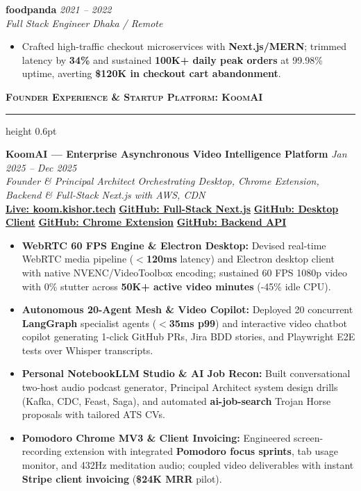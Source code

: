 \documentclass[9.5pt,a4paper]{article}
\newcommand{\resumesection}[1]{%
    \vspace{4.0pt}%
    {\color{burgundy}\scshape\bfseries\fontsize{10.0pt}{11.2pt}\selectfont #1}%
    \vspace{1.0pt}%
    \hrule height 0.6pt\relax%
    \vspace{2.5pt}%
}
\begin{document}
\vspace{2.0pt}
\noindent\textbf{foodpanda} \hfill {\small\textit{2021 -- 2022}}\\
\textit{Full Stack Engineer} \hfill {\footnotesize\textit{Dhaka / Remote}}
\begin{itemize}
    \item Crafted high-traffic checkout microservices with \textbf{Next.js/MERN}; trimmed latency by \textbf{34\%} and sustained \textbf{100K+ daily peak orders} at 99.98\% uptime, averting \textbf{\$120K in checkout cart abandonment}.
\end{itemize}

\resumesection{Founder Experience \& Startup Platform: KoomAI}

\noindent\textbf{KoomAI --- Enterprise Asynchronous Video Intelligence Platform} \hfill {\small\textit{Jan 2025 -- Dec 2025}}\\
\textit{Founder \& Principal Architect \;\textbar\; Orchestrating Desktop, Chrome Extension, Backend \& Full-Stack Next.js with AWS, CDN}\\[1.5pt]
{\footnotesize
    \href{https://koom.kishor.tech/}{\textbf{Live: koom.kishor.tech}} \;\textbar\;
    \href{https://github.com/KishorKumarParoi/Koom-AI}{\textbf{GitHub: Full-Stack Next.js}} \;\textbar\;
    \href{https://github.com/KishorKumarParoi/Koom-ai-desktop}{\textbf{GitHub: Desktop Client}} \;\textbar\;
    \href{https://github.com/KishorKumarParoi/Koom-AI-Chrome-Extension}{\textbf{GitHub: Chrome Extension}} \;\textbar\;
    \href{https://github.com/KishorKumarParoi/koom-ai-express}{\textbf{GitHub: Backend API}}
}
\begin{itemize}
    \item \textbf{WebRTC 60 FPS Engine \& Electron Desktop:} Devised real-time WebRTC media pipeline (\textbf{$<$120ms} latency) and Electron desktop client with native NVENC/VideoToolbox encoding; sustained 60 FPS 1080p video with 0\% stutter across \textbf{50K+ active video minutes} (-45\% idle CPU).
    \item \textbf{Autonomous 20-Agent Mesh \& Video Copilot:} Deployed 20 concurrent \textbf{LangGraph} specialist agents (\textbf{$<$35ms p99}) and interactive video chatbot copilot generating 1-click GitHub PRs, Jira BDD stories, and Playwright E2E tests over Whisper transcripts.
    \item \textbf{Personal NotebookLLM Studio \& AI Job Recon:} Built conversational two-host audio podcast generator, Principal Architect system design drills (Kafka, CDC, Feast, Saga), and automated \textbf{ai-job-search} Trojan Horse proposals with tailored ATS CVs.
    \item \textbf{Pomodoro Chrome MV3 \& Client Invoicing:} Engineered screen-recording extension with integrated \textbf{Pomodoro focus sprints}, tab usage monitor, and 432Hz meditation audio; coupled video deliverables with instant \textbf{Stripe client invoicing} (\textbf{\$24K MRR} pilot).
\end{itemize}
\end{document}
